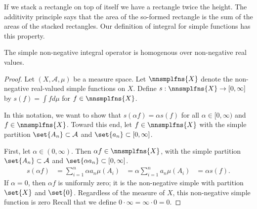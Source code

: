 

If we stack a rectangle
on top of itself we have
a rectangle twice
the height.
The additivity principle
says that the
area of the so-formed
rectangle is
the sum of the areas
of the stacked rectangles.
Our definition of
integral for simple functions
has this property.


\begin{prop}

The simple non-negative
integral operator
is homogenous
over non-negative
real values.

\begin{proof}

Let $(X, \mathcal{A}, \mu)$
be a measure space.
Let $\nnsmplfns{X}$ denote the
non-negative real-valued
simple functions on $X$.
Define
$s: \nnsmplfns{X} \to [0, \infty]$
by
$s(f) = \int f d\mu$
for
$f \in \nnsmplfns{X}$.

In this notation, we want to show
that
$s(\alpha f) = \alpha s(f)$
for all $\alpha \in [0, \infty)$
and $f \in \nnsmplfns{X}$.
Toward this end, let $f \in \nnsmplfns{X}$
with the simple partition
$\set{A_n} \subset \mathcal{A}$
and $\set{a_n} \subset [0, \infty]$.

%

First, let
$\alpha \in (0, \infty)$.
Then $\alpha f \in \nnsmplfns{X}$,
with the simple partition
$\set{A_n} \subset \mathcal{A}$
and $\set{\alpha a_n} \subset [0, \infty]$.
\[
  \begin{aligned}
  s(\alpha f) &= \sum_{i = 1}^{n} \alpha a_n \mu(A_i)
              &= \alpha \sum_{i = 1}^{n} a_n \mu(A_i)
              &= \alpha s(f).
  \end{aligned}
\]
If $\alpha = 0$, then $\alpha f$ is uniformly
zero; it is the non-negative simple
with partition $\set{X}$ and $\set{0}$.
Regardless of the measure of $X$,
this non-negative simple function is zero
Recall that we define
$0 \cdot \infty = \infty \cdot 0 = 0$.
\end{proof}

\end{prop}
